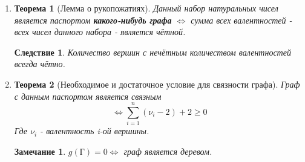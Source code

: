 \documentclass[a4paper,12pt]{article}
\newtheorem{theorem}{Теорема}
\newtheorem{notice}{Замечание}
\newtheorem{corollary}{Следствие}
\begin{document}
\begin{enumerate}
            \textit{Пояснение 3:} \textbf{минимальным остовным деревом} будем называть дерево, сумма рёбер которого минимальна среди всех остовных деревьев данного графа.
            \begin{enumerate}
                \item Найти самое дешёвое (самое дорогое) ребро в графе. Если таких несколько - берём любое.
                \item Ищем самоё дешёвое (самое дорогое) реброе среди рёбер, смежным с ребром из предыдущего пункта. Берём его.
                \item Проверяем, не вошли ли мы в цикл. Если вошли - выбираем другое смежное ребро.
                \item Повторяем алгоритм до тех пор, пока не обойдём все вершины.
            \end{enumerate}
            \item 
                \begin{theorem}[Лемма о рукопожатиях]
                    Данный набор натуральных чисел является паспортом \textbf{какого-нибудь графа} $\Leftrightarrow$ сумма всех валентностей - всех чисел данного набора -  является чётной.
                \end{theorem}
                \begin{corollary}
                    Количество вершин с нечётным количеством валентностей всегда чётно.
                \end{corollary}
            \item 
                \begin{theorem}[Необходимое и достаточное условие для связности графа]
                    Граф с данным паспортом является связным 
                    $$
                    \Leftrightarrow \sum_{i=1}^n \left(\nu_i - 2\right) + 2 \geq 0
                    $$
                    Где $\nu_i$ - валентность i-ой вершины. 
                \end{theorem}
                \begin{notice}
                    $g(Г) = 0 \Leftrightarrow $ граф является деревом.
                \end{notice}
            

\end{enumerate}
\end{document}
